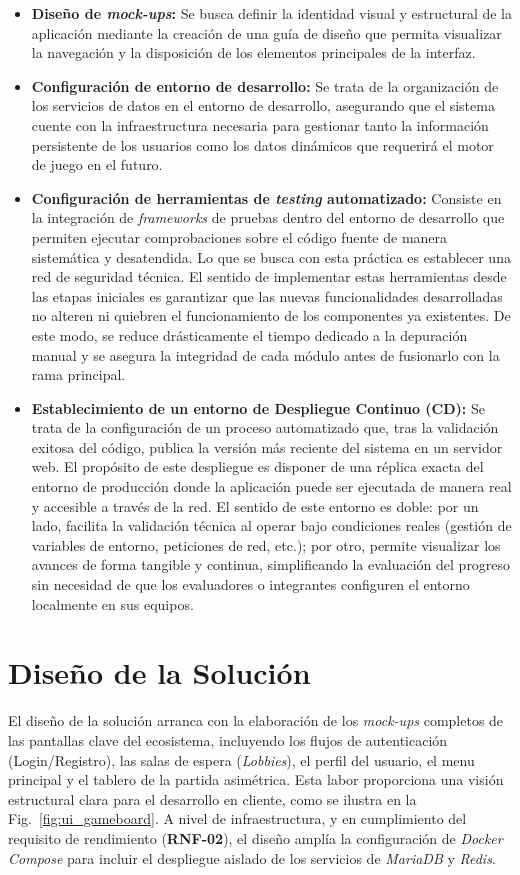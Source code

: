 \begin{itemize}
    \item \textbf{Diseño de \textit{mock-ups}:} Se busca definir la identidad visual y estructural de la aplicación mediante la creación de una guía de diseño que permita visualizar la navegación y la disposición de los elementos principales de la interfaz.
    \item \textbf{Configuración de entorno de desarrollo:} Se trata de la organización de los servicios de datos en el entorno de desarrollo, asegurando que el sistema cuente con la infraestructura necesaria para gestionar tanto la información persistente de los usuarios como los datos dinámicos que requerirá el motor de juego en el futuro.
    \item \textbf{Configuración de herramientas de \textit{testing} automatizado:} Consiste en la integración de \textit{frameworks} de pruebas dentro del entorno de desarrollo que permiten ejecutar comprobaciones sobre el código fuente de manera sistemática y desatendida. Lo que se busca con esta práctica es establecer una red de seguridad técnica. El sentido de implementar estas herramientas desde las etapas iniciales es garantizar que las nuevas funcionalidades desarrolladas no alteren ni quiebren el funcionamiento de los componentes ya existentes. De este modo, se reduce drásticamente el tiempo dedicado a la depuración manual y se asegura la integridad de cada módulo antes de fusionarlo con la rama principal.
    \item \textbf{Establecimiento de un entorno de Despliegue Continuo (CD):} Se trata de la configuración de un proceso automatizado que, tras la validación exitosa del código, publica la versión más reciente del sistema en un servidor web. El propósito de este despliegue es disponer de una réplica exacta del entorno de producción donde la aplicación puede ser ejecutada de manera real y accesible a través de la red. El sentido de este entorno es doble: por un lado, facilita la validación técnica al operar bajo condiciones reales (gestión de variables de entorno, peticiones de red, etc.); por otro, permite visualizar los avances de forma tangible y continua, simplificando la evaluación del progreso sin necesidad de que los evaluadores o integrantes configuren el entorno localmente en sus equipos.
\end{itemize}

\section{Diseño de la Solución}
El diseño de la solución arranca con la elaboración de los \textit{mock-ups} completos de las pantallas clave del ecosistema, incluyendo los flujos de autenticación (Login/Registro), las salas de espera (\textit{Lobbies}), el perfil del usuario, el menu principal y el tablero de la partida asimétrica. Esta labor proporciona una visión estructural clara para el desarrollo en cliente, como se ilustra en la Fig.~\ref{fig:ui_gameboard}. A nivel de infraestructura, y en cumplimiento del requisito de rendimiento (\textbf{RNF-02}), el diseño amplía la configuración de \textit{Docker Compose} para incluir el despliegue aislado de los servicios de \textit{MariaDB} y \textit{Redis}.

